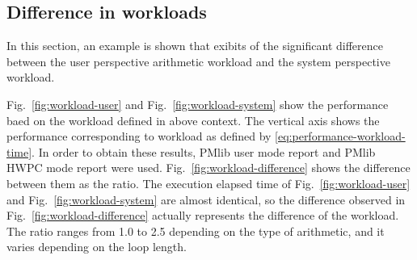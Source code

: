 \documentclass[conference]{IEEEtran}
\begin{document}
%
\subsection{Difference in workloads}
\label{subsection:difference-in-workloads}

In this section, an example is shown that exibits of the significant
difference between the user perspective arithmetic workload and
the system perspective workload.

Fig.~\ref{fig:workload-user} and Fig.~\ref{fig:workload-system} show
the performance baed on the workload defined in above context.
The vertical axis shows the performance corresponding to workload as
defined by \eqref{eq:performance-workload-time}.
In order to obtain these results, PMlib user mode report and PMlib HWPC mode
report were used.
Fig.~\ref{fig:workload-difference} shows the difference between
them as the ratio.
%
%
The execution elapsed time
of Fig.~\ref{fig:workload-user} and Fig.~\ref{fig:workload-system} are
almost identical, so the difference observed in
Fig.~\ref{fig:workload-difference} 
actually represents the difference of the workload.
The ratio ranges from 1.0 to 2.5 depending on the type of
arithmetic, and it varies depending on the loop length.
\end{document}
